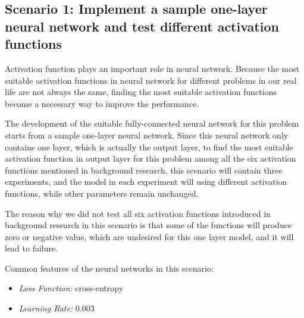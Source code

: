 \documentclass[]{UCD_CS_FYP_Report}
\begin{document}
\subsection{Scenario 1: Implement a sample one-layer neural network and test different activation functions}
Activation function plays an important role in neural network. Because the most suitable activation functions in neural network for different problems in our real life are not always the same, finding the most suitable activation functions become a necessary way to improve the performance. 

The development of the suitable fully-connected neural network for this problem starts from a sample one-layer neural network. Since this neural network only contains one layer, which is actually the output layer, to find the most suitable activation function in output layer for this problem among all the six activation functions mentioned in background research, this scenario will contain three experiments, and the model in each experiment will using different activation functions, while other parameters remain unchanged.

The reason why we did not test all six activation functions introduced in background research in this scenario is that some of the functions will produce zero or negative value, which are undesired for this one layer model, and it will lead to failure.

Common features of the neural networks in this scenario:
\begin{itemize}
\item {\sl Loss Function:} cross-entropy
\item {\sl Learning Rate:} 0.003
\end{itemize}
\end{document}
